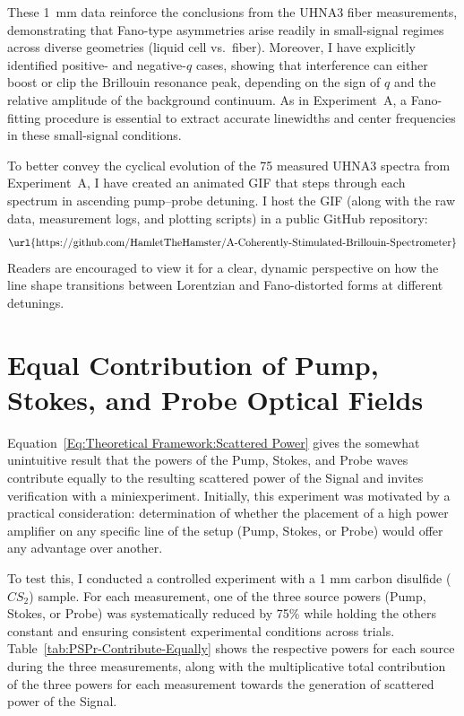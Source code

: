\FloatBarrier

These \SI{1}{\milli\meter}  data reinforce the conclusions from the UHNA3 fiber measurements, demonstrating that Fano-type asymmetries arise readily in small-signal regimes across diverse geometries (liquid cell vs.\ fiber). Moreover, I have explicitly identified positive- and negative-\(q\) cases, showing that interference can either boost or clip the Brillouin resonance peak, depending on the sign of \(q\) and the relative amplitude of the background continuum. As in Experiment~A, a Fano-fitting procedure is essential to extract accurate linewidths and center frequencies in these small-signal conditions.

\vspace{2em}

To better convey the cyclical evolution of the 75 measured UHNA3 spectra from Experiment~A, I have created an animated GIF that steps through each spectrum in ascending pump--probe detuning. I host the GIF (along with the raw data, measurement logs, and plotting scripts) in a public GitHub repository:
\[
\text{\url{https://github.com/HamletTheHamster/A-Coherently-Stimulated-Brillouin-Spectrometer}}
\]
Readers are encouraged to view it for a clear, dynamic perspective on how the line shape transitions between Lorentzian and Fano-distorted forms at different detunings.

\newpage


\section{Equal Contribution of Pump, Stokes, and Probe Optical Fields}

Equation~\ref{Eq:Theoretical Framework:Scattered Power} gives the somewhat unintuitive result that the powers of the Pump, Stokes, and Probe waves contribute equally to the resulting scattered power of the Signal and invites verification with a miniexperiment. Initially, this experiment was motivated by a practical consideration: determination of whether the placement of a high power amplifier on any specific line of the setup (Pump, Stokes, or Probe) would offer any advantage over another.

To test this, I conducted a controlled experiment with a 1 mm carbon disulfide ($CS_{2}$) sample. For each measurement, one of the three source powers (Pump, Stokes, or Probe) was systematically reduced by 75\% while holding the others constant and ensuring consistent experimental conditions across trials. Table~\ref{tab:PSPr-Contribute-Equally} shows the respective powers for each source during the three measurements, along with the multiplicative total contribution of the three powers for each measurement towards the generation of scattered power of the Signal.

